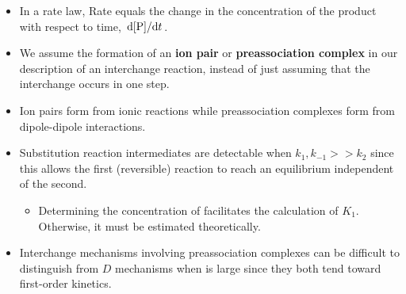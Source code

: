 \documentclass[../notes.tex]{subfiles}
\begin{document}
\begin{itemize}
    \item In a rate law, Rate equals the change in the concentration of the product with respect to time, $\dv*{[\ce{P}]}{t}$.
    \item We assume the formation of an \textbf{ion pair} or \textbf{preassociation complex} in our description of an interchange reaction, instead of just assuming that the interchange occurs in one step.
    \item Ion pairs form from ionic reactions while preassociation complexes form from dipole-dipole interactions.
    \item Substitution reaction intermediates are detectable when $k_1,k_{-1}>>k_2$ since this allows the first (reversible) reaction to reach an equilibrium independent of the second.
    \begin{itemize}
        \item Determining the concentration of \ce{[ML5X*Y]} facilitates the calculation of $K_1$. Otherwise, it must be estimated theoretically.
    \end{itemize}
    \item Interchange mechanisms involving preassociation complexes can be difficult to distinguish from $D$ mechanisms when \ce{[Y]} is large since they both tend toward first-order kinetics.
\end{itemize}
\end{document}
